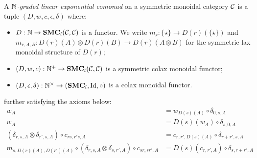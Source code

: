 \begin{definition}
A \emph{$\mathbb{N}$-graded linear exponential comonad} on a symmetric monoidal category $\mathcal{C}$ is a tuple
$(D, w,c,\epsilon,\delta)$ where:
\begin{itemize}

\item $D: \mathbb{N}\to \mathbf{SMC}_{l}(\mathcal{C}, \mathcal{C})$ is a functor. We write 
$m_{r}:\{\star\} \to D(r)(\{\star\})$ and $m_{r,A,B}: D(r)(A)\otimes D(r)(B) \to D(r)(A\otimes B)$ for the symmetric lax monoidal structure of $D(r)$;

\item $(D,w,c): \mathbb{N}^{+}\to \mathbf{SMC}_{l}(\mathcal{C}, \mathcal{C})$ is a symmetric colax monoidal functor;

\item $(D,\epsilon,\delta):\mathbb{N}^{\times}\to (\mathbf{SMC}_{l},\mathrm{Id},\circ) $ is a colax monoidal functor.



\end{itemize}
further satisfying the axioms below:
\begin{align}
w_{A}& =  w_{D(s)(A)}\circ \delta_{0,s,A}\\
w_{A} & = D(s)(w_{A} )\circ \delta_{s,0,A} \\
(\delta_{r,s,A}\otimes \delta_{r',s,A})\circ c_{rs,r's,A}
&=
c_{r,r',D(s)(A)}\circ \delta_{r+r',s,A}\\
m_{s,D(r)(A),D(r')(A)}\circ (\delta_{r,s,A}\otimes \delta_{s,r',A})\circ c_{sr,sr',A}&=
D(s)(c_{r,r',A})\circ \delta_{s,r+r',A}
\end{align}
\end{definition}


